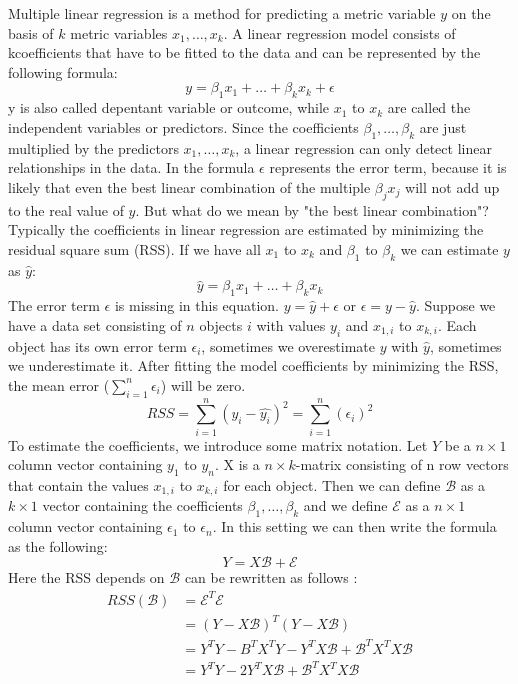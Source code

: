 \documentclass[12 pt]{scrartcl}
\begin{document}
Multiple linear regression is a method for predicting a metric variable $y$ on the basis of $k$ metric variables $x_1, \dots, x_k$. A linear regression model consists of kcoefficients that have to be fitted to the data and can be represented by the following formula:
\[ y = \beta_1x_1 + \dots + \beta_kx_k + \epsilon\]
y is also called depentant variable or outcome, while  $x_1$ to $x_k$ are called the independent variables or predictors. Since the coefficients $\beta_1, \dots, \beta_k$ are just multiplied by the predictors $x_1, \dots, x_k$, a linear regression can only detect linear relationships in the data. In the formula $\epsilon$ represents the error term, because it is likely that even the best linear combination of the multiple $\beta_jx_j$ will not add up to the real value of $y$.
But what do we mean by "the best linear combination"? Typically the coefficients in linear regression are estimated by minimizing the residual square sum (RSS). If we have all $x_1$ to $x_k$  and $\beta_1$ to $\beta_k$ we can estimate $y$ as $\hat{y}$:
\[ \hat{y} = \beta_1x_1 + \dots + \beta_kx_k\]
The error term $\epsilon$ is missing in this equation. $y = \hat{y} + \epsilon$ or $\epsilon = y - \hat{y}$.
Suppose we have a data set consisting of $n$ objects $i$ with values $y_i$ and $x_{1,i}$ to $x_{k,i}$. Each object has its own error term $\epsilon_i$, sometimes we overestimate $y$ with $\hat{y}$, sometimes we underestimate it. After fitting the model coefficients by minimizing the RSS, the mean error ($\sum^{n}_{i=1}{\epsilon_i}$) will be zero.
\[RSS = \sum^{n}_{i=1}{(y_i - \hat{y_i})^2} = \sum^{n}_{i=1}{(\epsilon_i)^2} \]
To estimate the coefficients, we  introduce some matrix notation. Let $Y$ be a $n \times 1$ column vector containing $y_1$ to $y_n$. X is a $n \times k$-matrix consisting of n row vectors that contain the values $x_{1,i}$ to $x_{k,i}$ for each object. Then we can define $\mathcal{B}$ as a $k \times 1$ vector containing the coefficients  $\beta_1, \dots, \beta_k$ and we define $\mathcal{E}$ as a $n \times 1$ column vector containing $\epsilon_1$ to $\epsilon_n$.
In this setting we can then write the formula as the following:
\[ Y =  X\mathcal{B} + \mathcal{E}\]
Here the RSS depends on $\mathcal{B}$ can be rewritten as follows \citep[p.~105]{fahrmeir2013regression}:
\begin{equation} \label{eq2}
  \begin{split}
    RSS(\mathcal{B}) & = \mathcal{E}^T\mathcal{E} \\
    & = (Y-X\mathcal{B})^T(Y-X\mathcal{B}) \\
    & = Y^TY - B^TX^TY - Y^TX\mathcal{B} + \mathcal{B}^TX^TX\mathcal{B} \\
    & = Y^TY   - 2Y^TX\mathcal{B} + \mathcal{B}^TX^TX\mathcal{B} \\
  \end{split}
\end{equation}
\end{document}
